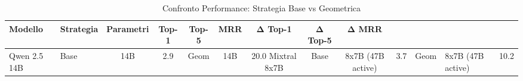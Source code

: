 \begin{table}[H]
\centering
\caption{Confronto Performance: Strategia Base vs Geometrica}
\label{tab:dual_strategy_comparison}
\begin{tabular}{llcccccccc}
\toprule
\textbf{Modello} & \textbf{Strategia} & \textbf{Parametri} & \textbf{Top-1} & \textbf{Top-5} & \textbf{MRR} & \textbf{Δ Top-1} & \textbf{Δ Top-5} & \textbf{Δ MRR} \\
\midrule
Qwen 2.5 14B & Base & 14B & 2.9%
 & Geom & 14B & 20.0%
\midrule
Mixtral 8x7B & Base & 8x7B (47B active) & 3.7%
 & Geom & 8x7B (47B active) & 10.2%
\bottomrule
\end{tabular}
\end{table}
